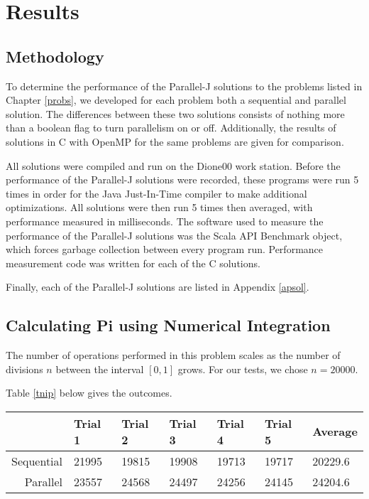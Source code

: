 \chapter{Results}
\label{res}

\section{Methodology}
To determine the performance of the Parallel-J solutions to the problems listed in Chapter \ref{probs}, 
we developed for each problem both a sequential and parallel solution. 
The differences between these two solutions consists of nothing more than a boolean flag 
to turn parallelism on or off. 
Additionally, the results of solutions in C with OpenMP for the same problems 
are given for comparison.

All solutions were compiled and run on the Dione00 work station. %
Before the performance of the Parallel-J solutions were recorded, 
these programs were run 5 times in order for the Java Just-In-Time compiler %
to make additional optimizations.
All solutions were then run 5 times then averaged, with performance measured in milliseconds.
The software used to measure the performance of the Parallel-J solutions was the Scala API Benchmark object, %
which forces garbage collection between every program run.
Performance measurement code was written for each of the C solutions.

Finally, each of the Parallel-J solutions are listed in Appendix \ref{apsol}. %

\section{Calculating Pi using Numerical Integration}
The number of operations performed in this problem scales 
as the number of divisions $n$ between the interval $[0,1]$ grows.
For our tests, we chose $n=20000$.

Table \ref{tnip} below gives the outcomes.

\begin{center}
\begin{tabular}{|r|l|l|l|l|l||l|}
\label{tnip}
	           & Trial 1 & Trial 2 & Trial 3 & Trial 4 & Trial 5 & Average \\ 
	\hline
	Sequential & 21995   & 19815   & 19908   & 19713   & 19717   & 20229.6 \\ 
	\hline
	Parallel   & 23557   & 24568   & 24497   & 24256   & 24145   & 24204.6 \\ 
	\hline
\end{tabular}
\end{center}

